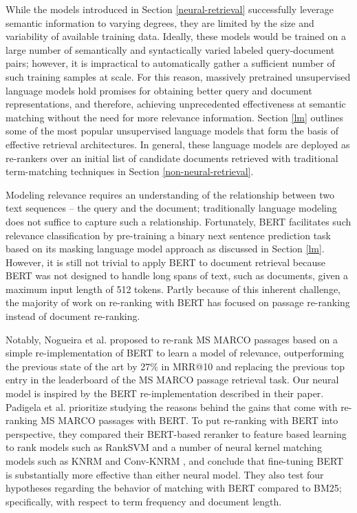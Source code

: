 While the models introduced in Section \ref{neural-retrieval} successfully leverage semantic information to varying degrees, they are limited by the size and variability of available training data.
Ideally, these models would be trained on a large number of semantically and syntactically varied labeled query-document pairs; however, it is impractical to automatically gather a sufficient number of such training samples at scale.
For this reason, massively pretrained unsupervised language models hold promises for obtaining better query and document representations, and therefore, achieving unprecedented effectiveness at semantic matching without the need for more relevance information.
Section \ref{lm} outlines some of the most popular unsupervised language models that form the basis of effective retrieval architectures.
In general, these language models are deployed as re-rankers over an initial list of candidate documents retrieved with traditional term-matching techniques in Section \ref{non-neural-retrieval}.

Modeling relevance requires an understanding of the relationship between two text sequences -- the query and the document; traditionally language modeling does not suffice to capture such a relationship.
Fortunately, BERT facilitates such relevance classification by pre-training a binary next sentence prediction task based on its masking language model approach as discussed in Section \ref{lm}.
However, it is still not trivial to apply BERT to document retrieval because BERT was not designed to handle long spans of text, such as documents, given a maximum input length of 512 tokens.
Partly because of this inherent challenge, the majority of work on re-ranking with BERT has focused on 
passage re-ranking instead of document re-ranking.

Notably, Nogueira et al. \cite{nogueira2019passage} proposed to re-rank MS MARCO passages based on a simple re-implementation of BERT to learn a model of relevance, outperforming the previous state of the art by 27\% in MRR@10 and replacing the previous top entry in the leaderboard of the MS MARCO passage retrieval task.
Our neural model is inspired by the BERT re-implementation described in their paper.
Padigela et al. \cite{Padigela:1905.01758:2019} prioritize studying the reasons behind the gains that come with re-ranking MS MARCO passages with BERT.
To put re-ranking with BERT into perspective, they compared their BERT-based reranker to feature based learning to rank models such as RankSVM \cite{joachims2002optimizing} and a number of neural kernel matching models such as KNRM \cite{xiong2017knrm} and Conv-KNRM \cite{dai2018convolutional}, and conclude that  fine-tuning BERT is substantially more effective than either neural model.
They also test four hypotheses regarding the behavior of matching with BERT compared to BM25; specifically, with respect to term frequency and document length.

